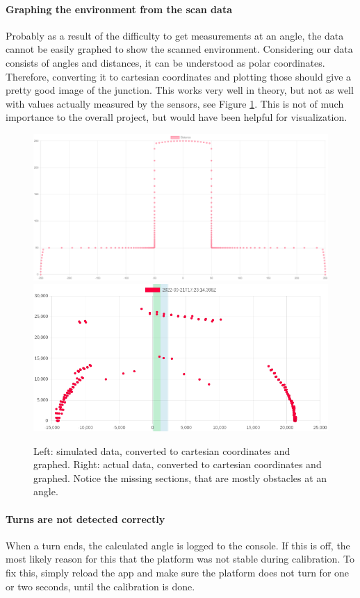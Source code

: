 \paragraph{Graphing the environment from the scan data} Probably as a result of the difficulty to get measurements at an angle, the data cannot be easily graphed to show the scanned environment.
Considering our data consists of angles and distances, it can be understood as polar coordinates.
Therefore, converting it to cartesian coordinates and plotting those should give a pretty good image of the junction.
This works very well in theory, but not as well with values actually measured by the sensors, see Figure \ref{fig:cartesian}.
This is not of much importance to the overall project, but would have been helpful for visualization.

\begin{figure}[H]
    \centering
    \includegraphics[width=0.45\linewidth]{figures/cartesian_simulated.png}
    \includegraphics[width=0.45\linewidth]{figures/cartesian_actual.png}
    \caption{Left: simulated data, converted to cartesian coordinates and
        graphed.
        Right: actual data, converted to cartesian coordinates and graphed.
        Notice the missing sections, that are mostly obstacles at an angle.}

    \label{fig:cartesian}
\end{figure}

\paragraph{Turns are not detected correctly} When a turn ends, the calculated angle is logged to the console. If this is off, the most likely reason for this that the platform was not stable during calibration. To fix this, simply reload the app and make sure the platform does not turn for one or two seconds, until the calibration is done.
